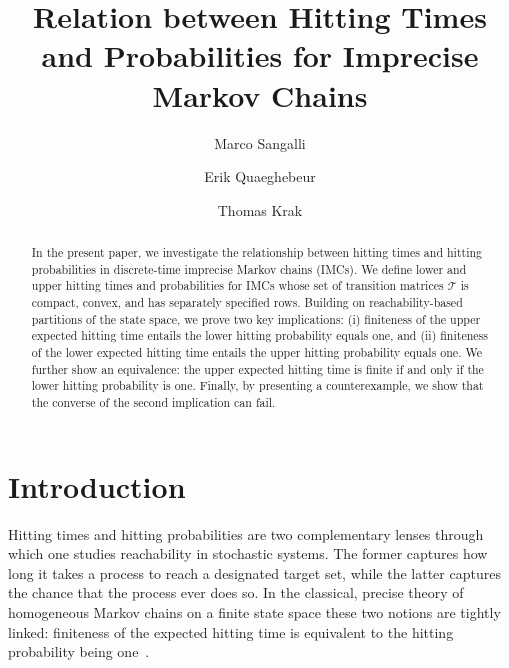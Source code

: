 \documentclass{svproc}
\newcommand{\T}{\mathcal{T}}
\begin{document}
	\mainmatter          
	\title{Relation between Hitting Times and Probabilities for Imprecise Markov Chains}
	\author{Marco Sangalli \and Erik Quaeghebeur \and Thomas Krak}
	
	\maketitle           
\begin{abstract}
    In the present paper, we investigate the relationship between hitting times and hitting probabilities in discrete-time imprecise Markov chains (IMCs). We define lower and upper hitting times and probabilities for IMCs whose set of transition matrices $\T$ is compact, convex, and has separately specified rows. Building on reachability-based partitions of the state space, we prove two key implications: (i) finiteness of the upper expected hitting time entails the lower hitting probability equals one, and (ii) finiteness of the lower expected hitting time entails the upper hitting probability equals one. We further show an equivalence: the upper expected hitting time is finite if and only if the lower hitting probability is one. Finally, by presenting a counterexample, we show that the converse of the second implication can fail.
	\end{abstract}
    \section{Introduction}
    Hitting times and hitting probabilities are two complementary lenses through which one studies reachability in stochastic systems. The former captures how long it takes a process to reach a designated target set, while the latter captures the chance that the process ever does so. In the classical, precise theory of homogeneous Markov chains on a finite state space these two notions are tightly linked: finiteness of the expected hitting time is equivalent to the hitting probability being one~\cite{levin2009markov, norrisbook1997markov}.
\end{document}
